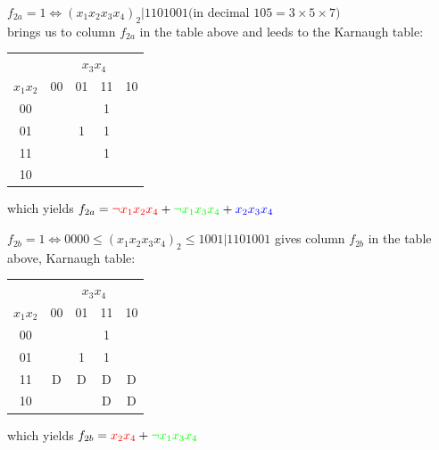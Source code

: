 \documentclass[10pt,a4paper]{scrartcl}
\newcommand{\subExercise}[1]{\vspace{0.5em} \noindent{\bf #1)}}
\begin{document}
\subExercise{a2}
$f_{2a} = 1 \Leftrightarrow (x_1x_2x_3x_4)_2 | 1101001 ($in decimal $105=3\times5\times7)$\\
brings us to column $f_{2a}$ in the table above and leeds to the Karnaugh table:\\
\begin{tabular}{|c||c|c|c|c|}
  \hline
            & \multicolumn{4}{c|}{$x_3x_4$} \\
$x_1x_2$ & 00                  & 01                  & 11                 & 10                \\ \hline
    00   &                     &                     & \cellcolor{green}1 &                   \\ \hline
    01   &                     & \cellcolor{red}1    & \cellcolor{gray}1  &                   \\ \hline
    11   &                     &                     & \cellcolor{blue}1  &                   \\ \hline
    10   &                     &                     &                    &                   \\
  \hline
\end{tabular}
which yields $f_{2a} = \textcolor{red}{\neg x_1x_2x_4}+
                       \textcolor{green}{\neg x_1x_3x_4}+
                       \textcolor{blue}{x_2x_3x_4}$



\subExercise{b}


$f_{2b} = 1 \Leftrightarrow 0000\leq(x_1x_2x_3x_4)_2\leq1001 | 1101001 $ gives column $f_{2b}$ in the table above, Karnaugh table:\\
\begin{tabular}{|c||c|c|c|c|}
  \hline
            & \multicolumn{4}{c|}{$x_3x_4$} \\
$x_1x_2$ & 00                  & 01                  & 11                 & 10                \\ \hline
    00   &                     &                     & \cellcolor{green}1 &                   \\ \hline
    01   &                     & \cellcolor{red}1    & \cellcolor{yellow}1&                   \\ \hline
    11   & D                   & \cellcolor{red}D    & \cellcolor{red}D   & D                 \\ \hline
    10   &                     &                     & D                  & D                 \\
  \hline
\end{tabular}
which yields $f_{2b} = \textcolor{red}{x_2x_4}+\textcolor{green}{\neg x_1x_3x_4}$
\end{document}
